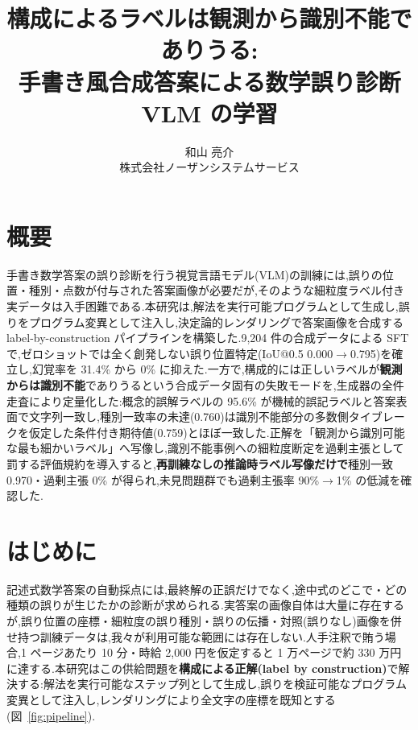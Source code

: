 \documentclass[a4paper,twocolumn,10pt]{jarticle}
\title{\textbf{構成によるラベルは観測から識別不能でありうる:\\手書き風合成答案による数学誤り診断 VLM の学習}}
\author{和山 亮介\\
株式会社ノーザンシステムサービス}
\date{}
\begin{document}
\maketitle
\thispagestyle{empty}

\section*{概要}
手書き数学答案の誤り診断を行う視覚言語モデル(VLM)の訓練には,誤りの位置・種別・点数が付与された答案画像が必要だが,そのような細粒度ラベル付き実データは入手困難である.本研究は,解法を実行可能プログラムとして生成し,誤りをプログラム変異として注入し,決定論的レンダリングで答案画像を合成する label-by-construction パイプラインを構築した.9,204 件の合成データによる SFT で,ゼロショットでは全く創発しない誤り位置特定(IoU@0.5 0.000$\rightarrow$0.795)を確立し,幻覚率を 31.4\% から 0\% に抑えた.一方で,構成的には正しいラベルが\textbf{観測からは識別不能}でありうるという合成データ固有の失敗モードを,生成器の全件走査により定量化した:概念的誤解ラベルの 95.6\% が機械的誤記ラベルと答案表面で文字列一致し,種別一致率の未達(0.760)は識別不能部分の多数側タイブレークを仮定した条件付き期待値(0.759)とほぼ一致した.正解を「観測から識別可能な最も細かいラベル」へ写像し,識別不能事例への細粒度断定を過剰主張として罰する評価規約を導入すると,\textbf{再訓練なしの推論時ラベル写像だけで}種別一致 0.970・過剰主張 0\% が得られ,未見問題群でも過剰主張率 90\%$\rightarrow$1\% の低減を確認した.

\section{はじめに}
記述式数学答案の自動採点には,最終解の正誤だけでなく,途中式のどこで・どの種類の誤りが生じたかの診断が求められる.実答案の画像自体は大量に存在するが,誤り位置の座標・細粒度の誤り種別・誤りの伝播・対照(誤りなし)画像を併せ持つ訓練データは,我々が利用可能な範囲には存在しない.人手注釈で賄う場合,1 ページあたり 10 分・時給 2,000 円を仮定すると 1 万ページで約 330 万円に達する.本研究はこの供給問題を\textbf{構成による正解(label by construction)}で解決する:解法を実行可能なステップ列として生成し,誤りを検証可能なプログラム変異として注入し,レンダリングにより全文字の座標を既知とする(図~\ref{fig:pipeline}).
\end{document}
